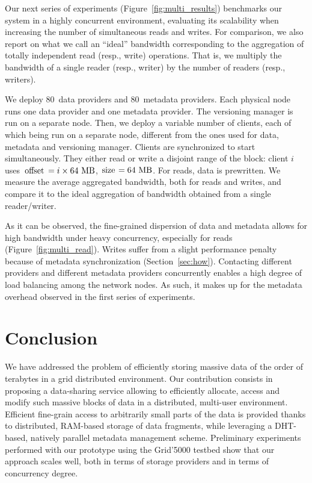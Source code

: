 \documentclass{llncs}
\newcommand{\myblock}[1]{\mbox{\lstinline{#1}}}
\newcommand{\myblockxspace}[1]{\myblock{#1}\xspace}
\newcommand{\Offset}{\myblockxspace{offset}}
\newcommand{\Size}{\myblockxspace{size}}
\newcommand{\MB}{\mbox{MB}}
\begin{document}
Our next series of experiments (Figure~\ref{fig:multi_results})
benchmarks our system in a highly concurrent environment, evaluating
its scalability when increasing the number of simultaneous reads and
writes. For comparison, we also report on what we call an ``ideal''
bandwidth corresponding to the aggregation of totally independent read
(resp., write) operations. That is, we multiply the bandwidth
of a single reader (resp., writer) by the number of readers
(resp., writers).  

We deploy 80~data providers and 80~metadata
providers.
Each physical node runs one data provider and one metadata
provider. The versioning manager is run on a separate node.
Then, we deploy a variable number of
clients, each of which being run on a separate node, different
from the ones used for data, metadata and versioning manager. Clients
are synchronized to start simultaneously.  They either read or write a
disjoint range of the block: client $i$ uses 
$\Offset = i \times 64~\MB$, $\Size =
64~\MB$.  For reads, data is prewritten. We measure the average
aggregated bandwidth, both for reads and writes, and compare it to the
ideal aggregation of bandwidth obtained from a single reader/writer.

As it can be observed, the fine-grained dispersion of data and metadata
allows for high bandwidth under heavy concurrency, especially for
reads (Figure~\ref{fig:multi_read}). Writes suffer from a slight
performance penalty because of metadata synchronization
(Section~\ref{sec:how}). Contacting different providers and different metadata
providers concurrently enables a high degree of load balancing among
the network nodes. As such, it makes up for the metadata overhead
observed in the first series of experiments.

\section{Conclusion}
\label{sec:conclusion}

We have addressed the problem of efficiently storing massive data of
the order of terabytes in a grid distributed environment. Our contribution
consists in proposing a data-sharing service allowing to efficiently
allocate, access and modify such massive blocks of data in a distributed,
multi-user environment. Efficient fine-grain access to arbitrarily
small parts of the data is provided thanks to distributed, RAM-based
storage of data fragments, while leveraging a DHT-based, natively 
parallel metadata management scheme. Preliminary experiments performed
with our prototype using the Grid'5000 testbed show that our approach
scales well, both in terms of storage providers and in terms of
concurrency degree.
\end{document}

